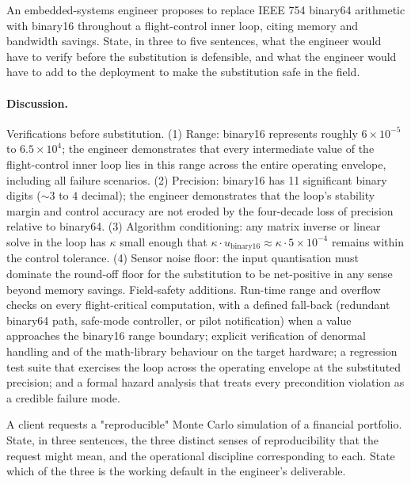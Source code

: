 \begin{exercise}
An embedded-systems engineer proposes to replace IEEE 754 binary64
arithmetic with binary16 throughout a flight-control inner loop,
citing memory and bandwidth savings. State, in three to five
sentences, what the engineer would have to verify before the
substitution is defensible, and what the engineer would have to
add to the deployment to make the substitution safe in the field.
\end{exercise}

\paragraph{Discussion.}
Verifications before substitution. (1) Range: binary16 represents
roughly $6 \times 10^{-5}$ to $6.5 \times 10^{4}$; the engineer
demonstrates that every intermediate value of the flight-control
inner loop lies in this range across the entire operating
envelope, including all failure scenarios. (2) Precision: binary16
has 11 significant binary digits ($\sim 3$ to $4$ decimal); the
engineer demonstrates that the loop's stability margin and
control accuracy are not eroded by the four-decade loss of
precision relative to binary64. (3) Algorithm conditioning: any
matrix inverse or linear solve in the loop has $\kappa$ small
enough that $\kappa \cdot u_{\text{binary16}} \approx \kappa \cdot
5 \times 10^{-4}$ remains within the control tolerance. (4) Sensor
noise floor: the input quantisation must dominate the round-off
floor for the substitution to be net-positive in any sense beyond
memory savings.
Field-safety additions. Run-time range and overflow checks on
every flight-critical computation, with a defined fall-back
(redundant binary64 path, safe-mode controller, or pilot
notification) when a value approaches the binary16 range
boundary; explicit verification of denormal handling and of the
math-library behaviour on the target hardware; a regression test
suite that exercises the loop across the operating envelope at
the substituted precision; and a formal hazard analysis that
treats every precondition violation as a credible failure mode.

\begin{exercise}
A client requests a "reproducible" Monte Carlo simulation of a
financial portfolio. State, in three sentences, the three
distinct senses of reproducibility that the request might mean,
and the operational discipline corresponding to each. State which
of the three is the working default in the engineer's
deliverable.
\end{exercise}

